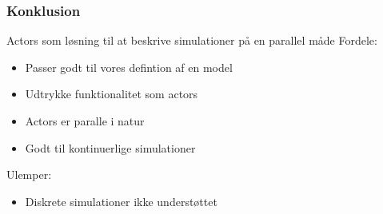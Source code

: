 \begin{frame}
	\frametitle{Konklusion}
	Actors som løsning til at beskrive simulationer på en parallel måde
  Fordele:
    \begin{itemize}
      \item Passer godt til vores defintion af en model
      \item Udtrykke funktionalitet som actors
      \item Actors er paralle i natur
      \item Godt til kontinuerlige simulationer
    \end{itemize}
  Ulemper:
    \begin{itemize}
      \item Diskrete simulationer ikke understøttet
    \end{itemize}
\end{frame}

